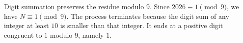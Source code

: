 Digit summation preserves the residue modulo $9$. Since $2026\equiv1\pmod9$, we have $N\equiv1\pmod9$. The process terminates because the digit sum of any integer at least $10$ is smaller than that integer. It ends at a positive digit congruent to $1$ modulo $9$, namely $\boxed1$.
